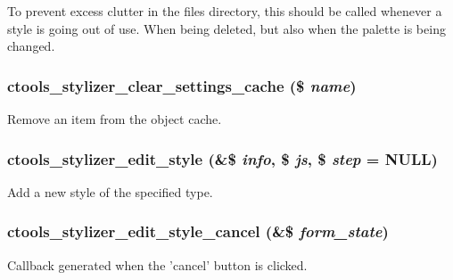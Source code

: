 To prevent excess clutter in the files directory, this should be called whenever a style is going out of use. When being deleted, but also when the palette is being changed. \hypertarget{includes_2stylizer_8inc_ab91af32e3082d221aa8144c028118dfb}{
\subsubsection[{ctools\_\-stylizer\_\-clear\_\-settings\_\-cache}]{\setlength{\rightskip}{0pt plus 5cm}ctools\_\-stylizer\_\-clear\_\-settings\_\-cache (\$ {\em name})}}
\label{includes_2stylizer_8inc_ab91af32e3082d221aa8144c028118dfb}
Remove an item from the object cache. \hypertarget{includes_2stylizer_8inc_a2994ded9c52e1e455c4a30ea32e00dfe}{
\subsubsection[{ctools\_\-stylizer\_\-edit\_\-style}]{\setlength{\rightskip}{0pt plus 5cm}ctools\_\-stylizer\_\-edit\_\-style (\&\$ {\em info}, \/  \$ {\em js}, \/  \$ {\em step} = {\ttfamily NULL})}}
\label{includes_2stylizer_8inc_a2994ded9c52e1e455c4a30ea32e00dfe}
Add a new style of the specified type. \hypertarget{includes_2stylizer_8inc_af02ad7c6b2aab483f496fffa2c8cf216}{
\subsubsection[{ctools\_\-stylizer\_\-edit\_\-style\_\-cancel}]{\setlength{\rightskip}{0pt plus 5cm}ctools\_\-stylizer\_\-edit\_\-style\_\-cancel (\&\$ {\em form\_\-state})}}
\label{includes_2stylizer_8inc_af02ad7c6b2aab483f496fffa2c8cf216}
Callback generated when the 'cancel' button is clicked.

